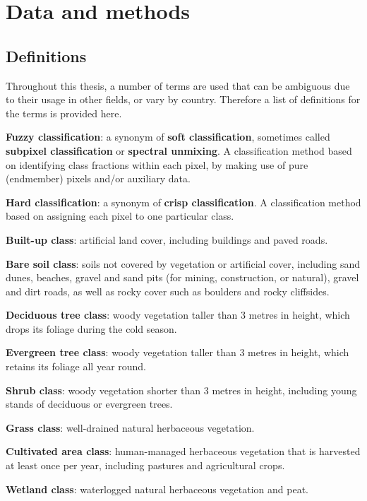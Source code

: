 \documentclass[a4paper,10pt]{book}
\begin{document}
\chapter{Data and methods}

\section{Definitions}

Throughout this thesis, a number of terms are used that can be ambiguous due to their usage in other fields, or vary by country. Therefore a list of definitions for the terms is provided here.

\textbf{Fuzzy classification}: a synonym of \textbf{soft classification}, sometimes called \textbf{subpixel classification} or \textbf{spectral unmixing}. A classification method based on identifying class fractions within each pixel, by making use of pure (endmember) pixels and/or auxiliary data.

\textbf{Hard classification}: a synonym of \textbf{crisp classification}. A classification method based on assigning each pixel to one particular class.

\textbf{Built-up class}: artificial land cover, including buildings and paved roads.

\textbf{Bare soil class}: soils not covered by vegetation or artificial cover, including sand dunes, beaches, gravel and sand pits (for mining, construction, or natural), gravel and dirt roads, as well as rocky cover such as boulders and rocky cliffsides.

\textbf{Deciduous tree class}: woody vegetation taller than 3 metres in height, which drops its foliage during the cold season.

\textbf{Evergreen tree class}: woody vegetation taller than 3 metres in height, which retains its foliage all year round.

\textbf{Shrub class}: woody vegetation shorter than 3 metres in height, including young stands of deciduous or evergreen trees.

\textbf{Grass class}: well-drained natural herbaceous vegetation.

\textbf{Cultivated area class}: human-managed herbaceous vegetation that is harvested at least once per year, including pastures and agricultural crops.

\textbf{Wetland class}: waterlogged natural herbaceous vegetation and peat.
\end{document}
